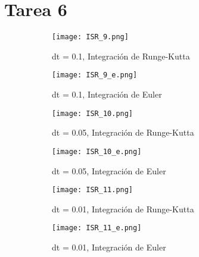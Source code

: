 \section{Tarea 6}
\begin{figure}[H]
	\centering
	\begin{subfigure}[b]{0.8\textwidth}
		\centering
		\texttt{[image: ISR\_9.png]}
		\caption{dt = 0.1, Integración de Runge-Kutta}
	\end{subfigure}
	\hfill
	\begin{subfigure}[b]{0.8\textwidth}
		\centering
		\texttt{[image: ISR\_9\_e.png]}
		\caption{dt = 0.1, Integración de Euler}
	\end{subfigure}
	\caption{}
\end{figure}
\begin{figure}[H]
	\centering
	\begin{subfigure}[b]{0.8\textwidth}
		\centering
		\texttt{[image: ISR\_10.png]}
		\caption{dt = 0.05, Integración de Runge-Kutta}
	\end{subfigure}
	\hfill
	\begin{subfigure}[b]{0.8\textwidth}
		\centering
		\texttt{[image: ISR\_10\_e.png]}
		\caption{dt = 0.05, Integración de Euler}
	\end{subfigure}
	\caption{}
\end{figure}
\begin{figure}[H]
	\centering
	\begin{subfigure}[b]{0.8\textwidth}
		\centering
		\texttt{[image: ISR\_11.png]}
		\caption{dt = 0.01, Integración de Runge-Kutta}
	\end{subfigure}
	\hfill
	\begin{subfigure}[b]{0.8\textwidth}
		\centering
		\texttt{[image: ISR\_11\_e.png]}
		\caption{dt = 0.01, Integración de Euler}
	\end{subfigure}
	\caption{}
\end{figure}
